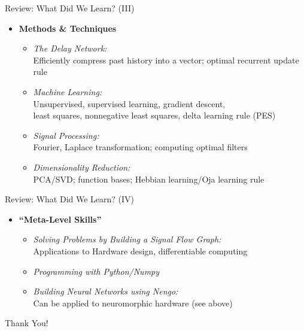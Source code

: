 \documentclass[handout,aspectratio=169]{beamer}
\begin{document}
\begin{frame}{Review: What Did We Learn? (III)}
	\begin{itemize}
		\item \textbf{Methods \& Techniques}\\[0.25cm]
		\begin{itemize}
			\setlength{\itemsep}{0.25cm}
			\item \emph{The Delay Network:}\\
			Efficiently compress past history into a vector; optimal recurrent update rule
			\item \emph{Machine Learning:}\\
			Unsupervised, supervised learning, gradient descent,\\least squares, nonnegative least squares, delta learning rule (PES)
			\item \emph{Signal Processing:}\\
			Fourier, Laplace transformation; computing optimal filters
			\item \emph{Dimensionality Reduction:}\\
			PCA/SVD; function bases; Hebbian learning/Oja learning rule
		\end{itemize}
	\end{itemize}
\end{frame}


\begin{frame}{Review: What Did We Learn? (IV)}
	\begin{itemize}
		\item \textbf{\enquote{Meta-Level Skills}}\\[0.25cm]
		\begin{itemize}
			\setlength{\itemsep}{0.5cm}
			\item \emph{Solving Problems by Building a Signal Flow Graph:}\\
			Applications to Hardware design, differentiable computing
			\item \emph{Programming with Python/Numpy}
			\item \emph{Building Neural Networks using Nengo:}\\
			Can be applied to neuromorphic hardware (see above)
		\end{itemize}
	\end{itemize}
\end{frame}

\begin{frame}{}
	\centering
	{\Huge Thank You!}
\end{frame}
\end{document}
